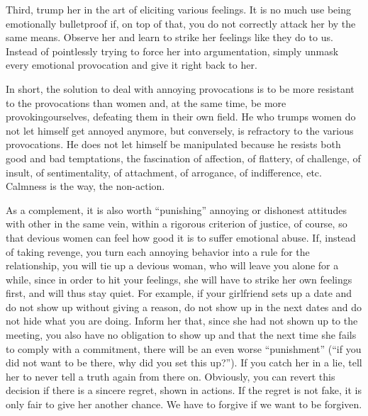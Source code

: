 
\par Third, trump her in the art of eliciting various feelings. It is no much use being emotionally bulletproof if, on top of that, you do not correctly attack her by the same means. Observe her and learn to strike her feelings like they do to us. Instead of pointlessly trying to force her into argumentation, simply unmask every emotional provocation and give it right back to her.

\par In short, the solution to deal with annoying provocations is to be more resistant to the provocations than women and, at the same time, be more provoking\footnotemark[35] ourselves, defeating them in their own field. He who trumps women do not let himself get annoyed anymore, but conversely, is refractory to the various provocations. He does not let himself be manipulated because he resists both good and bad temptations, the fascination of affection, of flattery, of challenge, of insult, of sentimentality, of attachment, of arrogance, of indifference, etc. Calmness is the way, the non-action.


\par As a complement, it is also worth \enquote{punishing} annoying or dishonest attitudes with other in the same vein, within a rigorous criterion of justice, of course, so that devious women can feel how good it is to suffer emotional abuse. If, instead of taking revenge, you turn each annoying behavior into a rule for the relationship, you will tie up a devious woman, who will leave you alone for a while, since in order to hit your feelings, she will have to strike her own feelings first, and will thus stay quiet. For example, if your girlfriend sets up a date and do not show up without giving a reason, do not show up in the next dates and do not hide what you are doing. Inform her that, since she had not shown up to the meeting, you also have no obligation to show up and that the next time she fails to comply with a commitment, there will be an even worse \enquote{punishment} (\enquote{if you did not want to be there, why did you set this up?}). If you catch her in a lie, tell her to never tell a truth again from there on. Obviously, you can revert this decision if there is a sincere regret, shown in actions. If the regret is not fake, it is only fair to give her another chance. We have to forgive if we want to be forgiven.

